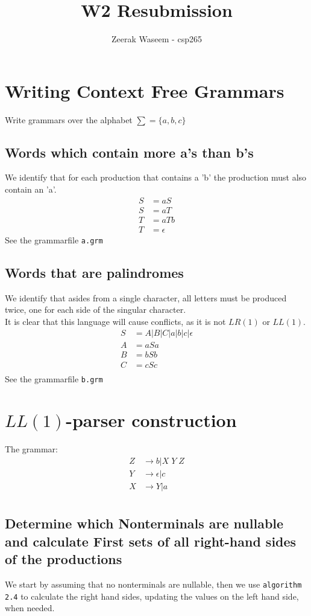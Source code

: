 \documentclass{article}
\title{W2 Resubmission}
\author{Zeerak Waseem - csp265}
\begin{document}
\maketitle
\newpage
\section{Writing Context Free Grammars}
Write grammars over the alphabet \(\sum = \{a, b, c\}\)
\subsection{Words which contain more a's than b's}
We identify that for each production that contains a 'b' the production must also contain an 'a'.
\begin{align*}
S &= aS\\
S &= aT\\
T &= aTb\\
T &= \epsilon
\end{align*}
See the grammarfile \texttt{a.grm}
\subsection{Words that are palindromes}
We identify that asides from a single character, all letters must be produced twice, one for each side of the singular character.\\
It is clear that this language will cause conflicts, as it is not \(LR(1)\) or \(LL(1)\).
\begin{align*}
S &= A | B | C | a | b | c | \epsilon\\
A &= aSa\\
B &= bSb\\
C &= cSc\\
\end{align*}
See the grammarfile \texttt{b.grm}
\section{\(LL(1)\)-parser construction}
The grammar:
\begin{align*}
Z &\rightarrow b | X\; Y\; Z\\
Y &\rightarrow \epsilon | c\\
X &\rightarrow Y | a\\
\end{align*}
\subsection{Determine which Nonterminals are nullable and calculate First sets of all right-hand sides of the productions}
We start by assuming that no nonterminals are nullable, then we use \texttt{algorithm 2.4} to calculate the right hand sides, updating the values on the left hand side, when needed.
\end{document}
